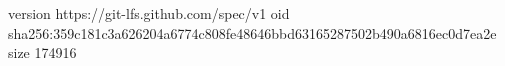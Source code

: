 version https://git-lfs.github.com/spec/v1
oid sha256:359c181c3a626204a6774c808fe48646bbd63165287502b490a6816ec0d7ea2e
size 174916

